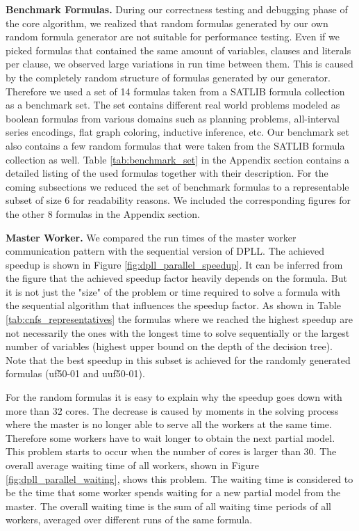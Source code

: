 \documentclass[letterpaper]{article}
\newcommand{\mypar}[1]{{\bf #1.}}
\begin{document}
\mypar{Benchmark Formulas}
During our correctness testing and debugging phase of the core algorithm, we realized that random formulas generated by our own random formula generator are not suitable for performance testing.
Even if we picked formulas that contained the same amount of variables, clauses and literals per clause, we observed large variations in run time between them.
This is caused by the completely random structure of formulas generated by our generator.
Therefore we used a set of 14 formulas taken from a SATLIB formula collection as a benchmark set. \cite{cnf_website}
The set contains different real world problems modeled as boolean formulas from various domains such as planning problems,
all-interval series encodings, flat graph coloring, inductive inference, etc.
Our benchmark set also contains a few random formulas that were taken from the SATLIB formula collection as well.
Table \ref{tab:benchmark_set} in the Appendix section contains a detailed listing of the used formulas together with their description.
For the coming subsections we reduced the set of benchmark formulas to a representable subset of size 6 for readability reasons.
We included the corresponding figures for the other 8 formulas in the Appendix section.

\mypar{Master Worker}
We compared the run times of the master worker communication pattern with the sequential version of DPLL.
The achieved speedup is shown in Figure \ref{fig:dpll_parallel_speedup}.
It can be inferred from the figure that the achieved speedup factor heavily depends on the formula.
But it is not just the "size" of the problem or time required to solve a formula with the sequential algorithm that influences the speedup factor.
As shown in Table \ref{tab:cnfs_representatives} the formulas where we reached the highest speedup are not necessarily the ones with the longest time to solve sequentially or the largest number of variables (highest upper bound on the depth of the decision tree).
Note that the best speedup in this subset is achieved for the randomly generated formulas (uf50-01 and uuf50-01).

For the random formulas it is easy to explain why the speedup goes down with more than 32 cores.
The decrease is caused by moments in the solving process where the master is no longer able to serve all the workers at the same time.
Therefore some workers have to wait longer to obtain the next partial model.
This problem starts to occur when the number of cores is larger than 30.
The overall average waiting time of all workers, shown in Figure \ref{fig:dpll_parallel_waiting}, shows this problem.
The waiting time is considered to be the time that some worker spends waiting for a new partial model from the master.
The overall waiting time is the sum of all waiting time periods of all workers, averaged over different runs of the same formula.
\end{document}
